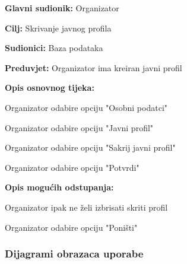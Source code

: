 					\noindent {}
					\begin{packed_item}
	
						\item \textbf{Glavni sudionik:} Organizator
						\item  \textbf{Cilj:} Skrivanje javnog profila
						\item  \textbf{Sudionici:} Baza podataka
						\item  \textbf{Preduvjet:} Organizator ima kreiran javni profil
						\item  \textbf{Opis osnovnog tijeka:}
						
						\item[] \begin{packed_enum}
	
							\item Organizator odabire opciju "Osobni podatci"
							\item Organizator odabire opciju "Javni profil"
							\item Organizator odabire opciju "Sakrij javni profil"
							\item Organizator odabire opciju "Potvrdi"
						\end{packed_enum}

						\item  \textbf{Opis mogućih odstupanja:}
						
						\item[] \begin{packed_item}
	
							\item[4.a] Organizator ipak ne želi izbrisati skriti profil
							\item[] \begin{packed_enum}
								
								\item Organizator odabire opciju "Poništi"
								
							\end{packed_enum}
						\end{packed_item}
					\end{packed_item}
				
				\newpage
				\subsubsection{Dijagrami obrazaca uporabe}
					

